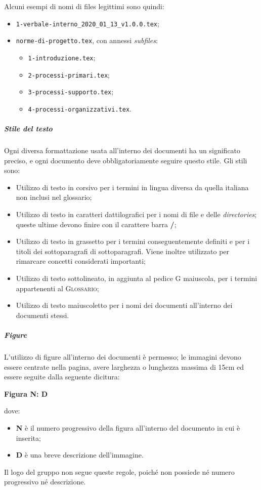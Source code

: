 \documentclass[../norme-di-progetto.tex]{subfiles}
\begin{document}
Alcuni esempi di nomi di files legittimi sono quindi:
\begin{itemize}
  \item \texttt{1-verbale-interno\_2020\_01\_13\_v1.0.0.tex};
  \item \texttt{norme-di-progetto.tex}, con annessi \textit{subfiles}:
    \begin{itemize}
      \item \texttt{1-introduzione.tex};
      \item \texttt{2-processi-primari.tex};
      \item \texttt{3-processi-supporto.tex};
      \item \texttt{4-processi-organizzativi.tex}.
    \end{itemize}
\end{itemize}

\subparagraph*{Stile del testo}
Ogni diversa formattazione usata all'interno dei documenti ha un significato preciso, e ogni documento deve obbligatoriamente seguire questo stile. Gli stili sono:
\begin{itemize}
  \item Utilizzo di testo in corsivo per i termini in lingua diversa da quella italiana non inclusi nel glossario;
  \item Utilizzo di testo in caratteri dattilografici per i nomi di file e delle \textit{directories}; queste ultime devono finire con il carattere barra \textbf{/};
  \item Utilizzo di testo in grassetto per i termini conseguentemente definiti e per i titoli dei sottoparagrafi di sottoparagrafi. Viene inoltre utilizzato per rimarcare concetti considerati importanti;
  \item Utilizzo di testo sottolineato, in aggiunta al pedice G maiuscola, per i termini appartenenti al \textsc{Glossario};
  \item Utilizzo di testo maiuscoletto per i nomi dei documenti all'interno dei documenti stessi.
\end{itemize}

\subparagraph*{Figure}
L'utilizzo di figure all'interno dei documenti è permesso; le immagini devono essere centrate nella pagina, avere larghezza o lunghezza massima di 15cm ed essere seguite dalla seguente dicitura: \\ \begin{center}
  \centering
  \textbf{Figura N: D}
\end{center} dove:
\begin{itemize}
  \item \textbf{N} è il numero progressivo della figura all'interno del documento in cui è inserita;
  \item \textbf{D} è una breve descrizione dell'immagine.
\end{itemize}
Il logo del gruppo non segue queste regole, poiché non possiede né numero progressivo né descrizione.
\end{document}

